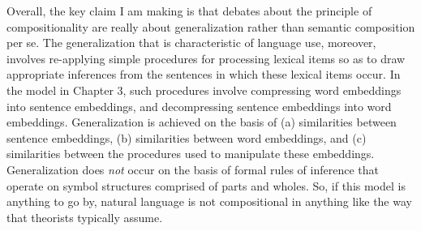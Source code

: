 Overall, the key claim I am making is that debates about the principle of compositionality are really about generalization rather than semantic composition per se. The generalization that is characteristic of language use, moreover, involves re-applying simple procedures for processing lexical items so as to draw appropriate inferences from the sentences in which these lexical items occur. In the model in Chapter 3, such procedures involve compressing word embeddings into sentence embeddings, and decompressing sentence embeddings into word embeddings. Generalization is achieved on the basis of (a) similarities between sentence embeddings, (b) similarities between word embeddings, and (c) similarities between the procedures used to manipulate these embeddings.  Generalization does \textit{not} occur on the basis of formal rules of inference that operate on symbol structures comprised of parts and wholes. So, if this model is anything to go by, natural language is not compositional in anything like the way that theorists typically assume. 